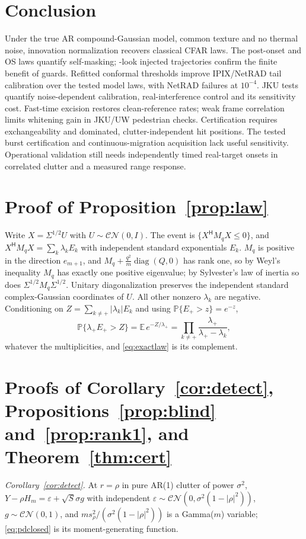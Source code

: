 \documentclass[journal]{IEEEtran}
\newcommand{\PP}{\mathbb{P}}
\begin{document}
\section{Conclusion}
Under the true AR compound-Gaussian model, common texture and no thermal noise, innovation normalization recovers classical CFAR laws. The post-onset and OS laws quantify self-masking; \LongLooks{}-look injected trajectories confirm the finite benefit of guards. Refitted conformal thresholds improve IPIX/NetRAD tail calibration over the tested model laws, with NetRAD failures at $10^{-4}$. JKU tests quantify noise-dependent calibration, real-interference control and its sensitivity cost. Fast-time excision restores clean-reference rates; weak frame correlation limits whitening gain in JKU/UW pedestrian checks. Certification requires exchangeability and dominated, clutter-independent hit positions. The tested burst certification and continuous-migration acquisition lack useful sensitivity. Operational validation still needs independently timed real-target onsets in correlated clutter and a measured range response.

\appendices
\section{Proof of Proposition~\ref{prop:law}}\label{app:law}
Write $X=\Sigma^{1/2}U$ with $U\sim\mathcal{CN}(0,I)$. The event is $\{X^{\mathsf H}M_qX\le0\}$, and $X^{\mathsf H}M_qX=\sum_k\lambda_kE_k$ with independent standard exponentials $E_k$. $M_q$ is positive in the direction $e_{m+1}$, and $M_q+\frac{q^2}{m}\operatorname{diag}(Q,0)$ has rank one, so by Weyl's inequality $M_q$ has exactly one positive eigenvalue; by Sylvester's law of inertia so does $\Sigma^{1/2}M_q\Sigma^{1/2}$. Unitary diagonalization preserves the independent standard complex-Gaussian coordinates of $U$. All other nonzero $\lambda_k$ are negative. Conditioning on $Z=\sum_{k\ne+}|\lambda_k|E_k$ and using $\PP\{E_+>z\}=e^{-z}$,
\[
\PP\{\lambda_+E_+>Z\}=\mathbb E\,e^{-Z/\lambda_+}=\prod_{k\ne+}\frac{\lambda_+}{\lambda_+-\lambda_k},
\]
whatever the multiplicities, and \eqref{eq:exactlaw} is its complement.

\section{Proofs of Corollary~\ref{cor:detect}, Propositions~\ref{prop:blind} and~\ref{prop:rank1}, and Theorem~\ref{thm:cert}}\label{app:detect}
\emph{Corollary~\ref{cor:detect}.} At $r=\rho$ in pure AR(1) clutter of power $\sigma^2$, $Y-\rho H_m=\varepsilon+\sqrt S\sigma g$ with independent $\varepsilon\sim\mathcal{CN}(0,\sigma^2(1-|\rho|^2))$, $g\sim\mathcal{CN}(0,1)$, and $ms_\rho^2/(\sigma^2(1-|\rho|^2))$ is a Gamma($m$) variable; \eqref{eq:pdclosed} is its moment-generating function.
\end{document}
